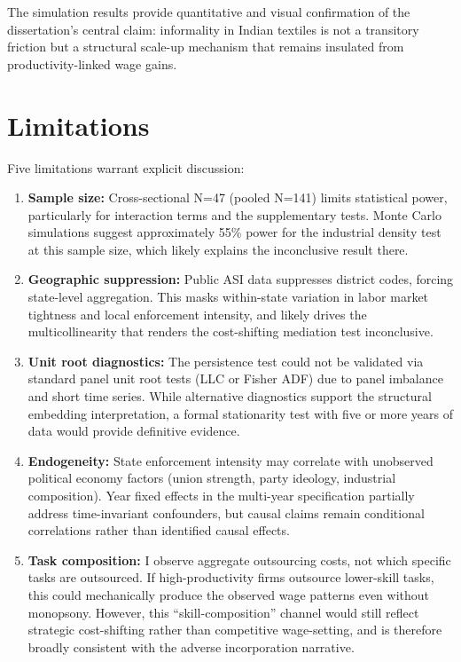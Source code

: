 The simulation results provide quantitative and visual confirmation of the dissertation's central claim: informality in Indian textiles is not a transitory friction but a structural scale-up mechanism that remains insulated from productivity-linked wage gains.

\section{Limitations}
\label{sec:limitations}

Five limitations warrant explicit discussion:

\begin{enumerate}
	\item \textbf{Sample size:} Cross-sectional N=47 (pooled N=141) limits statistical power, particularly for interaction terms and the supplementary tests. Monte Carlo simulations suggest approximately 55\% power for the industrial density test at this sample size, which likely explains the inconclusive result there.
	
	\item \textbf{Geographic suppression:} Public ASI data suppresses district codes, forcing state-level aggregation. This masks within-state variation in labor market tightness and local enforcement intensity, and likely drives the multicollinearity that renders the cost-shifting mediation test inconclusive.
	
	\item \textbf{Unit root diagnostics:} The persistence test could not be validated via standard panel unit root tests (LLC or Fisher ADF) due to panel imbalance and short time series. While alternative diagnostics support the structural embedding interpretation, a formal stationarity test with five or more years of data would provide definitive evidence.
	
	\item \textbf{Endogeneity:} State enforcement intensity may correlate with unobserved political economy factors (union strength, party ideology, industrial composition). Year fixed effects in the multi-year specification partially address time-invariant confounders, but causal claims remain conditional correlations rather than identified causal effects.
	
	\item \textbf{Task composition:} I observe aggregate outsourcing costs, not which specific tasks are outsourced. If high-productivity firms outsource lower-skill tasks, this could mechanically produce the observed wage patterns even without monopsony. However, this ``skill-composition'' channel would still reflect strategic cost-shifting rather than competitive wage-setting, and is therefore broadly consistent with the adverse incorporation narrative.
\end{enumerate}

